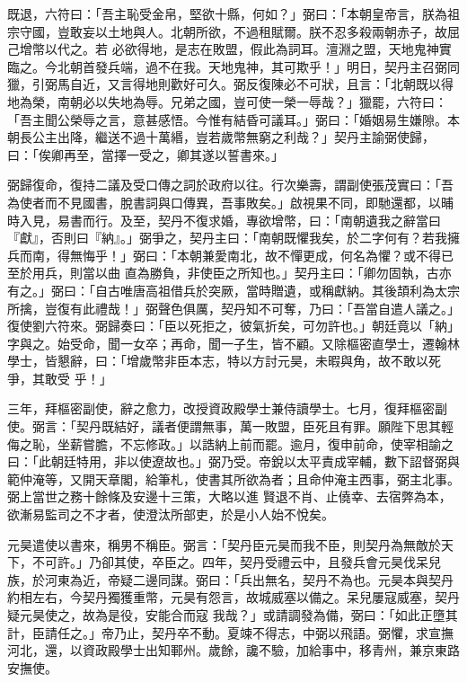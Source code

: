 \begin{pinyinscope}
 既退，六符曰：「吾主恥受金帛，堅欲十縣，何如？」弼曰：「本朝皇帝言，朕為祖宗守國，豈敢妄以土地與人。北朝所欲，不過租賦爾。朕不忍多殺兩朝赤子，故屈己增幣以代之。若
 必欲得地，是志在敗盟，假此為詞耳。澶淵之盟，天地鬼神實臨之。今北朝首發兵端，過不在我。天地鬼神，其可欺乎！」明日，契丹主召弼同獵，引弼馬自近，又言得地則歡好可久。弼反復陳必不可狀，且言：「北朝既以得地為榮，南朝必以失地為辱。兄弟之國，豈可使一榮一辱哉？」獵罷，六符曰：「吾主聞公榮辱之言，意甚感悟。今惟有結昏可議耳。」弼曰：「婚姻易生嫌隙。本朝長公主出降，繼送不過十萬緡，豈若歲幣無窮之利哉？」契丹主諭弼使歸，
 曰：「俟卿再至，當擇一受之，卿其遂以誓書來。」



 弼歸復命，復持二議及受口傳之詞於政府以往。行次樂壽，謂副使張茂實曰：「吾為使者而不見國書，脫書詞與口傳異，吾事敗矣。」啟視果不同，即馳還都，以晡時入見，易書而行。及至，契丹不復求婚，專欲增幣，曰：「南朝遺我之辭當曰『獻』，否則曰『納』。」弼爭之，契丹主曰：「南朝既懼我矣，於二字何有？若我擁兵而南，得無悔乎！」弼曰：「本朝兼愛南北，故不憚更成，何名為懼？或不得已至於用兵，則當以曲
 直為勝負，非使臣之所知也。」契丹主曰：「卿勿固執，古亦有之。」弼曰：「自古唯唐高祖借兵於突厥，當時贈遺，或稱獻納。其後頡利為太宗所擒，豈復有此禮哉！」弼聲色俱厲，契丹知不可奪，乃曰：「吾當自遣人議之。」復使劉六符來。弼歸奏曰：「臣以死拒之，彼氣折矣，可勿許也。」朝廷竟以「納」字與之。始受命，聞一女卒；再命，聞一子生，皆不顧。又除樞密直學士，遷翰林學士，皆懇辭，曰：「增歲幣非臣本志，特以方討元昊，未暇與角，故不敢以死爭，其敢受
 乎！」



 三年，拜樞密副使，辭之愈力，改授資政殿學士兼侍讀學士。七月，復拜樞密副使。弼言：「契丹既結好，議者便謂無事，萬一敗盟，臣死且有罪。願陛下思其輕侮之恥，坐薪嘗膽，不忘修政。」以誥納上前而罷。逾月，復申前命，使宰相諭之曰：「此朝廷特用，非以使遼故也。」弼乃受。帝銳以太平責成宰輔，數下詔督弼與範仲淹等，又開天章閣，給筆札，使書其所欲為者；且命仲淹主西事，弼主北事。弼上當世之務十餘條及安邊十三策，大略以進
 賢退不肖、止僥幸、去宿弊為本，欲漸易監司之不才者，使澄汰所部吏，於是小人始不悅矣。



 元昊遣使以書來，稱男不稱臣。弼言：「契丹臣元昊而我不臣，則契丹為無敵於天下，不可許。」乃卻其使，卒臣之。四年，契丹受禮云中，且發兵會元昊伐呆兒族，於河東為近，帝疑二邊同謀。弼曰：「兵出無名，契丹不為也。元昊本與契丹約相左右，今契丹獨獲重幣，元昊有怨言，故城威塞以備之。呆兒屢寇威塞，契丹疑元昊使之，故為是役，安能合而寇
 我哉？」或請調發為備，弼曰：「如此正墮其計，臣請任之。」帝乃止，契丹卒不動。夏竦不得志，中弼以飛語。弼懼，求宣撫河北，還，以資政殿學士出知鄆州。歲餘，讒不驗，加給事中，移青州，兼京東路安撫使。




\end{pinyinscope}
